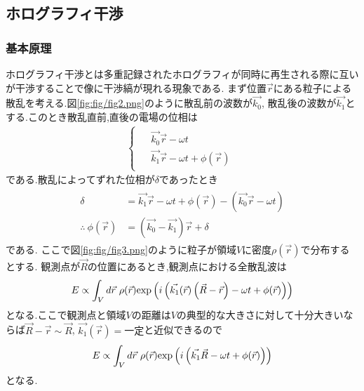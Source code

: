 \subsection{ホログラフィ干渉}
\subsubsection{基本原理}
ホログラフィ干渉とは多重記録されたホログラフィが同時に再生される際に互いが干渉することで像に干渉縞が現れる現象である.
まず位置$\vec{r}$にある粒子による散乱を考える.図\ref{fig:fig/fig2.png}のように散乱前の波数が$\vec{k_0}$,
散乱後の波数が$\vec{k_1}$とする.このとき散乱直前,直後の電場の位相は
\begin{align}
  \begin{cases}
    \begin{split}
      &\vec{k_0}\vec{r}-\omega t\\
      &\vec{k_1}\vec{r}-\omega t+\phi(\vec{r})
    \end{split}
  \end{cases}
\end{align}
である.散乱によってずれた位相が$\delta$であったとき
\begin{align}
  \begin{split} 
    \delta&=\vec{k_1}\vec{r}-\omega t+\phi(\vec{r})-(\vec{k_0}\vec{r}-\omega t)\\
    \therefore\ \phi(\vec{r})&=(\vec{k_0}-\vec{k_1})\vec{r}+\delta
  \end{split}
\end{align}
である.
ここで図\ref{fig:fig/fig3.png}のように粒子が領域$V$に密度$\rho(\vec{r})$で分布するとする.
観測点が$\vec{R}$の位置にあるとき,観測点における全散乱波は
\begin{align}
  E\propto\int_Vd\vec{r}\ \rho(\vec{r}){\rm exp}\left(i\left(\vec{k_1}(\vec{r})\left(\vec{R}-\vec{r}\right)-\omega t+\phi(\vec{r})\right)\right)
\end{align}
となる.ここで観測点と領域$V$の距離は$V$の典型的な大きさに対して十分大きいならば$\vec{R}-\vec{r}\sim\vec{R}$,
$\vec{k_1}(\vec{r})=一定$と近似できるので
\begin{align}
  E\propto\int_Vd\vec{r}\ \rho(\vec{r}){\rm exp}\left(i\left(\vec{k_1}\vec{R}-\omega t+\phi(\vec{r})\right)\right)
\end{align}
となる.

